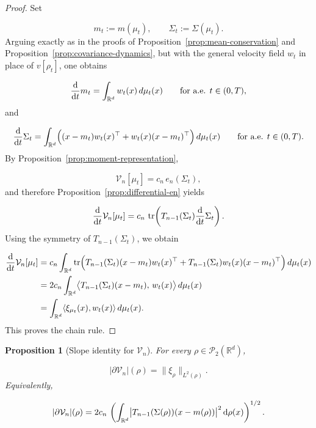 \documentclass[11pt,reqno]{amsart}
\numberwithin{figure}{section}
\def\d {{\partial}}
\def\d{\mathrm{d}}
\renewcommand{\d}{  {\textup{d}} }
\newtheorem{proposition}{Proposition}[section]
\begin{document}
\begin{proof}

Set 

\[ m_t:=m(\mu_t), \qquad \Sigma_t:=\Sigma(\mu_t). \] 
Arguing exactly as in the proofs of Proposition~\ref{prop:mean-conservation} and Proposition~\ref{prop:covariance-dynamics}, but with the general velocity field $w_t$ in place of $v[\rho_t]$, one obtains

\[ \frac{\d}{\d t}m_t = \int_{\mathbb R^d}w_t(x)\,d\mu_t(x) \qquad\text{for a.e. }t\in(0,T), \] 
and 

\[ \frac{\d}{\d t}\Sigma_t = \int_{\mathbb R^d} \Bigl((x-m_t)w_t(x)^\top+w_t(x)(x-m_t)^\top\Bigr)\,d\mu_t(x) \qquad\text{for a.e. }t\in(0,T). \] 
By Proposition~\ref{prop:moment-representation}, 

\[ \mathcal V_n[\mu_t]=c_n\,e_n(\Sigma_t), \] 
and therefore Proposition~\ref{prop:differential-en} yields 

\[ \frac{\d}{\d t}\mathcal V_n[\mu_t] = c_n\,\operatorname{tr}\!\left(T_{n-1}(\Sigma_t)\frac{\d}{\d t}\Sigma_t\right). \] 
Using the symmetry of $T_{n-1}(\Sigma_t)$, we obtain 

\[ \begin{aligned} \frac{\d}{\d t}\mathcal V_n[\mu_t] &= c_n\int_{\mathbb R^d} \operatorname{tr}\Bigl( T_{n-1}(\Sigma_t)(x-m_t)w_t(x)^\top + T_{n-1}(\Sigma_t)w_t(x)(x-m_t)^\top \Bigr)\,d\mu_t(x) \\ &= 2c_n\int_{\mathbb R^d} \bigl\langle T_{n-1}(\Sigma_t)(x-m_t),\,w_t(x)\bigr\rangle\,d\mu_t(x) \\ &= \int_{\mathbb R^d}\langle \xi_{\mu_t}(x),w_t(x)\rangle\,d\mu_t(x). \end{aligned} \]
This proves the chain rule. \end{proof} 

\begin{proposition}[Slope identity for $\mathcal V_n$] \label{prop:slope-identity-Vn} For every $\rho\in\mathcal P_2(\mathbb R^d)$, 

\[ |\partial \mathcal V_n|(\rho) = \|\xi_\rho\|_{L^2(\rho)}. \]
Equivalently, 

\[ |\partial \mathcal V_n|(\rho) = 2c_n\, \left( \int_{\mathbb R^d} \bigl|T_{n-1}(\Sigma(\rho))(x-m(\rho))\bigr|^2\,\d\rho(x) \right)^{1/2}. \] \end{proposition} 
\end{document}
